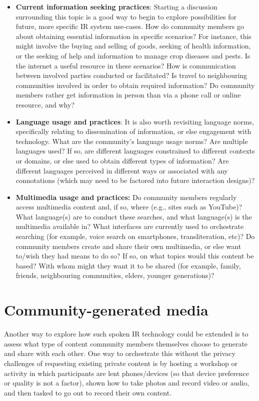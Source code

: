 \documentclass[10pt,twoside,openright]{report}
\begin{document}
\begin{itemize}
    \item \textbf{Current information seeking practices}: Starting a discussion surrounding this topic is a good way to begin to explore possibilities for future, more specific IR system use-cases.
    How do community members go about obtaining essential information in specific scenarios?
    For instance, this might involve the buying and selling of goods, seeking of health information, or the seeking of help and information to manage crop diseases and pests.
    Is the internet a useful resource in these scenarios?
    How is communication between involved parties conducted or facilitated?
    Is travel to neighbouring communities involved in order to obtain required information?
    Do community members rather get information in person than via a phone call or online resource, and why?
    \item \textbf{Language usage and practices}: It is also worth revisiting language norms, specifically relating to dissemination of information, or else engagement with technology.
    What are the community's language usage norms?
    Are multiple languages used?
    If so, are different languages constrained to different contexts or domains, or else used to obtain different types of information?
Are different languages perceived in different ways or associated with any connotations (which may need to be factored into future interaction designs)?
    \item \textbf{Multimedia usage and practices:} %
    Do community members regularly access multimedia content and, if so, where (e.g., sites such as YouTube)? What language(s) are to conduct these searches, and what language(s) is the multimedia available in?
    What interfaces are currently used to orchestrate searching (for example, voice search on smartphones, transliteration, etc)?
    Do community members create and share their own multimedia, or else want to/wish they had means to do so?
    If so, on what topics would this content be based?
    With whom might they want it to be shared (for example, family, friends, neighbouring communities, elders, younger generations)?   
\end{itemize}


\section{Community-generated media}
Another way to explore how such spoken IR technology could be extended is to assess what type of content community members themselves choose to generate and share with each other.
One way to orchestrate this without the privacy challenges of requesting existing private content is by hosting a workshop or activity in which participants are lent phones/devices (so that device preference or quality is not a factor), shown how to take photos and record video or audio, and then tasked to go out to record their own content. 
\end{document}
